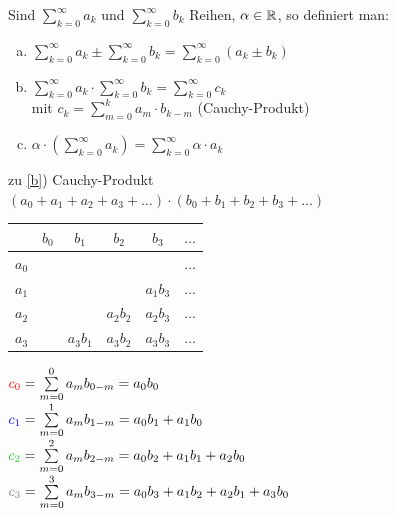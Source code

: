 \Def Sind $\sum\limits_{k=0}^{\infty}a_k$ und $\sum\limits_{k=0}^{\infty}b_k$ Reihen, $\alpha\in\mathbb{R}$, so definiert man:
\begin{enumerate}[a)]
	\item $\sum\limits_{k=0}^{\infty}a_k\pm \sum\limits_{k=0}^{\infty}b_k = \sum\limits_{k=0}^{\infty}(a_k\pm b_k)$
	\item\label{b} $\sum\limits_{k=0}^{\infty}a_k\cdot \sum\limits_{k=0}^{\infty}b_k = \sum\limits_{k=0}^{\infty}c_k$\\
	mit $c_k = \sum\limits_{m=0}^{k}a_m\cdot b_{k-m}$ (Cauchy-Produkt)
	\item $\alpha\cdot \left(\sum\limits_{k=0}^{\infty}a_k\right) = \sum\limits_{k=0}^{\infty}\alpha\cdot a_k$
\end{enumerate}

\Bem zu \ref*{b}) Cauchy-Produkt\\
$(a_0+a_1+a_2+a_3+\ldots)\cdot(b_0+b_1+b_2+b_3+\ldots)$

\begin{tabular}{c|c|c|c|c|c}
	& $b_0$ & $b_1$ & $b_2$ & $b_3$ & $\ldots$ \\
	\hline
	$a_0$ & \red{$a_0b_0$} & \blue{$a_0b_1$} & \green{$a_0b_2$} & \gray{$a_0b_3$} & $\ldots$ \\
	\hline
	$a_1$ & \blue{$a_1b_0$} & \green{$a_1b_1$} & \gray{$a_1b_2$} & $a_1b_3$ & $\ldots$ \\
	\hline
	$a_2$ & \green{$a_2b_0$} & \gray{$a_2b_1$} & $a_2b_2$ & $a_2b_3$ & $\ldots$ \\
	\hline
	$a_3$ & \gray{$a_3b_0$} & $a_3b_1$ & $a_3b_2$ & $a_3b_3$ & $\ldots$ \\
\end{tabular}

$\textcolor{red}{c_0} = \sum\limits_{m=0}^{0}a_mb_{0-m} = a_0b_0$\\
$\textcolor{blue}{c_1} = \sum\limits_{m=0}^{1}a_mb_{1-m} = a_0b_1+a_1b_0$\\
$\green{c_2} = \sum\limits_{m=0}^{2}a_mb_{2-m} = a_0b_2+a_1b_1+a_2b_0$\\
$\gray{c_3} = \sum\limits_{m=0}^{3}a_mb_{3-m} = a_0b_3+a_1b_2+a_2b_1+a_3b_0$\\

\clearpage
